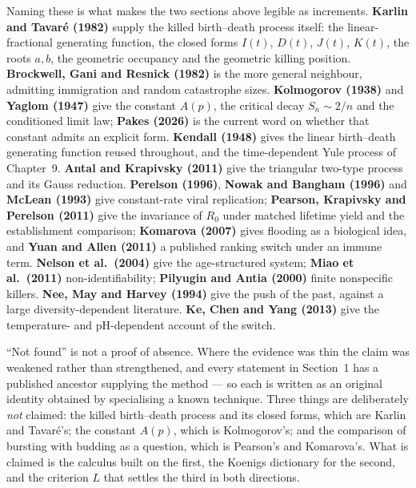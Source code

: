 {\footnotesize\noindent
Naming these is what makes the two sections above legible as increments.
\textbf{Karlin and Tavar\'e (1982)} supply the killed birth--death process itself: the
linear-fractional generating function, the closed forms $I(t)$, $D(t)$, $J(t)$, $K(t)$, the
roots $a,b$, the geometric occupancy and the geometric killing position. \textbf{Brockwell,
Gani and Resnick (1982)} is the more general neighbour, admitting immigration and random
catastrophe sizes. \textbf{Kolmogorov (1938)} and \textbf{Yaglom (1947)} give the constant
$A(p)$, the critical decay $S_n\sim2/n$ and the conditioned limit law; \textbf{Pakes (2026)}
is the current word on whether that constant admits an explicit form.
\textbf{Kendall (1948)} gives the linear birth--death generating function reused throughout,
and the time-dependent Yule process of Chapter~9. \textbf{Antal and Krapivsky (2011)} give
the triangular two-type process and its Gauss reduction. \textbf{Perelson (1996)}, \textbf{Nowak
and Bangham (1996)} and \textbf{McLean (1993)} give constant-rate viral replication;
\textbf{Pearson, Krapivsky and Perelson (2011)} give the invariance of $R_0$ under matched
lifetime yield and the establishment comparison; \textbf{Komarova (2007)} gives flooding as a
biological idea, and \textbf{Yuan and Allen (2011)} a published ranking switch under an immune
term. \textbf{Nelson et al.\ (2004)} give the age-structured system; \textbf{Miao et al.\
(2011)} non-identifiability; \textbf{Pilyugin and Antia (2000)} finite nonspecific killers.
\textbf{Nee, May and Harvey (1994)} give the push of the past, against a large
diversity-dependent literature. \textbf{Ke, Chen and Yang (2013)} give the temperature- and
pH-dependent account of the \yp{} switch.\par}

\oisec{4. Scope of the claims}

{\footnotesize\noindent
``Not found'' is not a proof of absence. Where the evidence was thin the claim was weakened
rather than strengthened, and every statement in Section~1 has a published ancestor supplying
the method --- so each is written as an original identity obtained by specialising a known
technique. Three things are deliberately \emph{not} claimed: the killed birth--death process
and its closed forms, which are Karlin and Tavar\'e's; the constant $A(p)$, which is
Kolmogorov's; and the comparison of bursting with budding as a question, which is Pearson's
and Komarova's. What is claimed is the calculus built on the first, the Koenigs dictionary
for the second, and the criterion $L$ that settles the third in both directions.\par}

